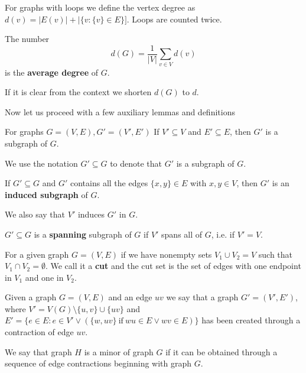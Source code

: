 For graphs with loops we define the vertex degree as $d(v) = |E(v)| + |\{v\colon \{v\} \in E\}]$. Loops are counted twice.

\begin{definition}
    The number
    \begin{equation*}
        d(G) = \frac1{|V|}\sum\limits_{v \in V}d(v)    
    \end{equation*}
    is the \textbf{average degree} of $G$.
\end{definition}
If it is clear from the context we shorten $d(G)$ to $d$.

Now let us proceed with a few auxiliary lemmas and definitions
\begin{definition}
For graphs $G = (V, E), G' = (V', E')$  If $V' \subseteq V$ and $E' \subseteq E$, then $G'$ is a subgraph of $G$.
\end{definition}
We use the notation $G' \subseteq G$ to denote that $G'$ is a subgraph of $G$.

\begin{definition}
    If $G' \subseteq G$ and $G'$ contains all the edges $\{x,y\} \in E$ with $x,y\in V$, then $G'$ is an \textbf{induced subgraph} of $G$. 
\end{definition}
We also say that $V'$ induces $G'$ in $G$.

\begin{definition}
    $G' \subseteq G$ is a \textbf{spanning} subgraph of $G$ if $V'$ spans all of $G$, i.e. if $V' = V$.  
\end{definition}

\begin{definition}
    For a given graph $G = (V, E)$ if we have nonempty sets $V_1 \cup V_2 = V$ such that $V_1 \cap V_2 =\emptyset$. We call it a \textbf{cut} and the cut set is the set of edges with one endpoint in $V_1$ and one in $V_2$.
\end{definition}

\begin{definition}
    Given a graph $G = (V, E)$ and an edge $uv$ we say that a graph $G' = (V', E')$, where $V' = V(G) \setminus \{u, v\} \cup\{uv\}$ and $E' = \{e \in E: e\in V' \lor (\{w, uv\}\ \text{if}\ wu \in E \lor wv \in E) \}$ has been created through a contraction of edge $uv$.
\end{definition}

\begin{definition}
    We say that graph $H$ is a minor of graph $G$ if it can be obtained through a sequence of edge contractions beginning with graph $G$.
\end{definition}

